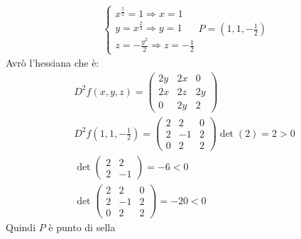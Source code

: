 \documentclass[a4paper, oneside]{article}
\begin{document}
\begin{example}
\begin{gather*}
                \begin{cases}
                    x^{\frac{5}{3}} = 1 \Rightarrow  x = 1\\
                    y = x^{\frac{2}{3}} \Rightarrow y = 1\\
                    z = -\frac{y^2}{2} \Rightarrow  z= -\frac{1}{2}
                \end{cases}
                P = (1, 1, -\frac{1}{2})
            \end{gather*}
            Avrò l'hessiana che è:
            \begin{gather*}
                D^2f(x,y,z) =
                \begin{pmatrix}
                    2y & 2x & 0\\
                    2x & 2z & 2y\\
                    0 & 2y & 2
                \end{pmatrix}\\
                D^2f(1,1,-\frac{1}{2}) = \begin{pmatrix}
                    2 & 2 & 0\\
                    2 & -1 & 2\\
                    0 & 2 & 2
                \end{pmatrix}
                \det(2) = 2 > 0\\
                \det\begin{pmatrix}
                    2 & 2\\
                    2 & -1
                \end{pmatrix} = -6 < 0\\
                \det\begin{pmatrix}
                    2 & 2 & 0\\
                    2 & -1 & 2\\
                    0 & 2 & 2
                \end{pmatrix} = -20 < 0
            \end{gather*}
            Quindi $P$ è punto di sella
        \end{example}
\end{document}
